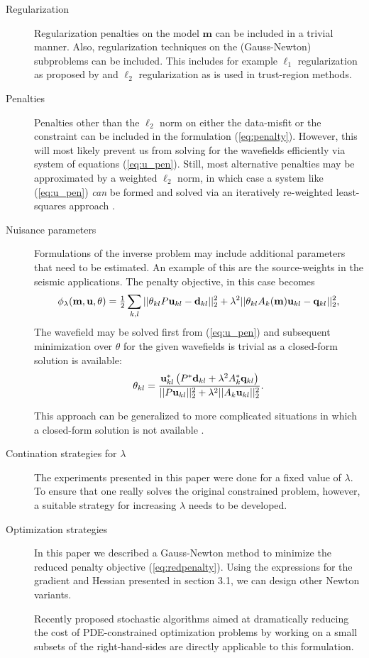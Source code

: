 \documentclass{iopart}
\begin{document}
\begin{description}
\item[Regularization] 
Regularization penalties on the model $\mathbf{m}$ can be included in
a trivial manner. Also, regularization techniques on the (Gauss-Newton)
subproblems can be included. This includes for example $\ell_1$
regularization as proposed by \cite{Li2012} and $\ell_2$ regularization
as is used in trust-region methods. 

\item[Penalties] 
Penalties other than the $\ell_2$ norm on either the data-misfit or the
constraint can be included in the formulation (\ref{eq:penalty}).
However, this will most likely prevent us from solving for the
wavefields efficiently via system of equations (\ref{eq:u_pen}). Still,
most alternative penalties may be approximated by a weighted $\ell_2$
norm, in which case a system like (\ref{eq:u_pen}) \emph{can} be formed 
and solved via an iteratively re-weighted least-squares approach \cite{Bjorck1979}.

\item[Nuisance parameters] 
Formulations of the inverse problem may include additional
parameters that need to be estimated. An example of this are the
source-weights in the seismic applications. The penalty objective, in
this case becomes
\[
\phi_{\lambda}(\mathbf{m},\mathbf{u},\theta) = {\textstyle\frac{1}{2}}\sum_{k,l}||\theta_{kl}P \mathbf{u}_{kl} - \mathbf{d}_{kl}||_2^2 + \lambda^2||\theta_{kl}A_k(\mathbf{m})\mathbf{u}_{kl} - \mathbf{q}_{kl}||_2^2,
\]
The wavefield may be solved first from (\ref{eq:u_pen}) and subsequent
minimization over $\theta$ for the given wavefields is trivial as a
closed-form solution is available:
\[
\theta_{kl} = \frac{\mathbf{u}_{kl}^*\left(P^*\mathbf{d}_{kl} + \lambda^2A_k^*\mathbf{q}_{kl}\right)}{||P\mathbf{u}_{kl}||_2^2 + \lambda^2 ||A_k\mathbf{u}_{kl}||_2^2}.
\]

This approach can be generalized to more complicated situations in which
a closed-form solution is not available \cite{Aravkin2012c}.

\item[Contination strategies for $\lambda$] 
The experiments presented in this paper were done for a fixed value of
$\lambda$. To ensure that one really solves the original constrained
problem, however, a suitable strategy for increasing $\lambda$ needs to
be developed.

\item[Optimization strategies]
In this paper we described a Gauss-Newton method to minimize the reduced
penalty objective (\ref{eq:redpenalty}). Using the expressions for the gradient and Hessian presented in section 3.1, we can design other Newton variants. 

Recently proposed stochastic algorithms aimed at dramatically reducing the cost of PDE-constrained optimization problems by working on a small subsets of the right-hand-sides \cite{Krebs09,Friedlander2012,Haber12,VanLeeuwen2012b} are directly applicable to this formulation.

\end{description}
\end{document}
